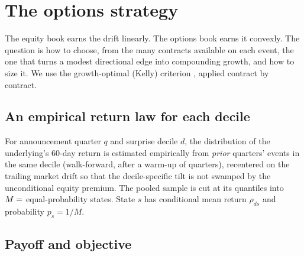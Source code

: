 \documentclass[11pt]{article}
\theoremstyle{definition}
\newcommand{\1}{\mathbf{1}}
\begin{document}
\begin{table}[t]\centering
\caption{The section's parameter search re-run on the corrected data and engine: return, Sharpe ratio, maximum drawdown and Sharpe ratio by era (1996--2001 / 2002--07 / 2008--13) for each setting. Source: \texttt{results/vol\_sweeps.csv}.}\label{tab:volsweeps}

\end{table}

\section{The options strategy}\label{sec:options}

The equity book earns the drift linearly. The options book earns it convexly. The question is how to choose, from the many contracts available on each event, the one that turns a modest directional edge into
compounding growth, and how to size it. We use the growth-optimal (Kelly) criterion \citep{Kelly1956,MacLeanThorpZiemba2011}, applied contract by contract.

\subsection{An empirical return law for each decile}

For announcement quarter $q$ and surprise decile $d$, the distribution of the underlying's 60-day return is estimated empirically from \emph{prior} quarters' events in the same decile (walk-forward, after a warm-up of  quarters),
recentered on the trailing market drift so that the decile-specific tilt is not swamped by the unconditional equity premium. The pooled sample is cut at its quantiles into $M=\stv{kelly.states}$ equal-probability states.
State $s$ has conditional mean return $\rho_{ds}$ and probability $p_s=1/M$.

\subsection{Payoff and objective}
\end{document}
